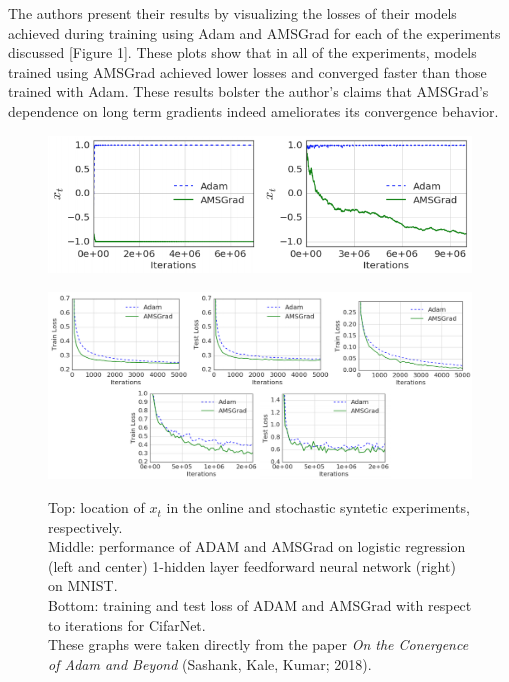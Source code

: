 \documentclass[letterpaper, 10 pt, conference]{ieeeconf}  %
\begin{document}
The authors present their results by visualizing the losses of their models achieved during training using Adam and AMSGrad for each of the experiments discussed [Figure 1]. These plots show that in all of the experiments, models trained using AMSGrad achieved lower losses and converged faster than those trained with Adam. These results bolster the author's claims that AMSGrad's dependence on long term gradients indeed ameliorates its convergence behavior.
\begin{figure}
\begin{minipage}{1\textwidth}
\centering
\begin{minipage}{0.55\textwidth}
  \centering
  \includegraphics[width=1\linewidth]{OG_synthetic.png}
  \label{fig:test2}
\end{minipage}%
\centering
\break
\begin{minipage}{0.9\textwidth}
  \centering
  \includegraphics[width=1\linewidth]{OG_results_nets.png}
  \label{fig:test2}
\end{minipage}%
\end{minipage}
\caption[]{Top: location of $x_t$ in the online and stochastic syntetic experiments, respectively. \\
Middle: performance of ADAM and AMSGrad on logistic regression (left and center) 1-hidden layer feedforward neural network (right) on MNIST.\\
Bottom: training and test loss of ADAM and AMSGrad with respect to iterations for CifarNet.\\
These graphs were taken directly from the paper \emph{On the Conergence of Adam and Beyond} (Sashank, Kale, Kumar; 2018).} 
\end{figure}    
   
\end{document}
